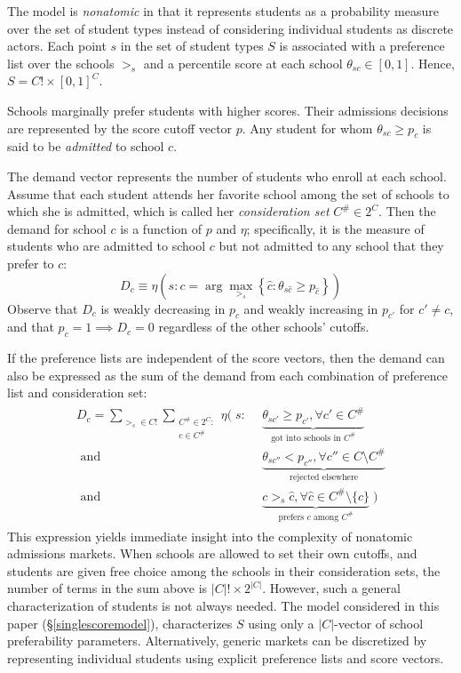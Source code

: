 \documentclass[12pt]{article}
\theoremstyle{definition}
\begin{document}
The model is \emph{nonatomic} in that it represents students as a probability measure over the set of student types instead of considering individual students as discrete actors. Each point $s$ in the set of student types $S$ is associated with a preference list over the schools $>_s$ and a percentile score at each school $\theta_{sc} \in [0,1]$. Hence, $S = C! \times [0, 1]^C$. 

Schools marginally prefer students with higher scores. Their admissions decisions are represented by the score cutoff vector $p$. Any student for whom $\theta_{sc} \geq p_c$ is said to be \emph{admitted} to school $c$. 

The demand vector represents the number of students who enroll at each school. Assume that each student attends her favorite school among the set of schools to which she is admitted, which is called her \emph{consideration set} $C^\# \in 2^C$. Then the demand for school $c$ is a function of $p$ and $\eta$; specifically, it is the measure of students who are admitted to school $c$ but not admitted to any school that they prefer to $c$:
\begin{equation} \label{demanddefinition}
D_c \equiv \eta\left(s: c = \arg \max_{>_s} \left\{\hat c: \theta_{s\hat c} \geq p_{\hat c} \right\}\right)
\end{equation}
Observe that $D_c$ is weakly decreasing in $p_c$ and weakly increasing in $p_{c'}$ for $c' \neq c$, and that $p_c = 1 \implies D_c = 0$ regardless of the other schools' cutoffs.

If the preference lists are independent of the score vectors, then the demand can also be expressed as the sum of the demand from each combination of preference list and consideration set:
\begin{gather} \label{demandbigsum}
\begin{aligned}
D_c = 
\sum_{>_s \in C!} \sum_{\substack{C^\# \in 2^{C}:\\ c \in C^\#}}
\eta\Big(\;s:&~~\underbrace{\theta_{sc'} \geq p_{c'}, \forall c' \in C^\#}_{\text{got into schools in } C^\# } \\
\text{ and} &~~\underbrace{\theta_{sc''} < p_{c''}, \forall c'' \in C \setminus C^\#}_{\text{rejected elsewhere}} \\
\text{ and} &~~\underbrace{c >_s \hat c, \forall \hat c \in C^\#\setminus \{c\}}_{\text{prefers } c \text{ among } C^\#} \;\Big)
\end{aligned}
\end{gather}
This expression yields immediate insight into the complexity of nonatomic admissions markets. When schools are allowed to set their own cutoffs, and students are given free choice among the schools in their consideration sets, the number of terms in the sum above is $|C|!\times2^{|C|}$. However, such a general characterization of students is not always needed. The model considered in this paper (\S\ref{singlescoremodel}), characterizes $S$ using only a $|C|$-vector of school preferability parameters. Alternatively, generic markets can be discretized by representing individual students using explicit preference lists and score vectors. 
\end{document}
